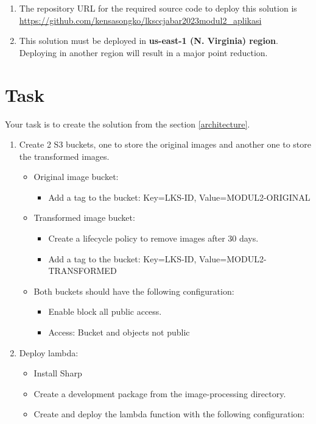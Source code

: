 \documentclass{article}
\begin{document}
\begin{enumerate}
\item The repository URL for the required source code to deploy this solution is \href{https://github.com/kensasongko/lksccjabar2023modul2_aplikasi}{https://github.com/kensasongko/lksccjabar2023modul2\_aplikasi}
\item This solution must be deployed in \textbf{us-east-1 (N. Virginia) region}. Deploying in another region will result in a major point reduction.
\end{enumerate}

\section{Task}
Your task is to create the solution from the section \ref{architecture}.
\begin{enumerate}
\item Create 2 S3 buckets, one to store the original images and another one to store the transformed images.
  \begin{itemize}
    \item Original image bucket:
    \begin{itemize}
      \item Add a tag to the bucket: Key=LKS-ID, Value=MODUL2-ORIGINAL
    \end{itemize}
    \item Transformed image bucket:
    \begin{itemize}
      \item Create a lifecycle policy to remove images after 30 days.
      \item Add a tag to the bucket: Key=LKS-ID, Value=MODUL2-TRANSFORMED
    \end{itemize}
    \item Both buckets should have the following configuration:
    \begin{itemize}
      \item Enable block all public access.
      \item Access: Bucket and objects not public
    \end{itemize}
  \end{itemize}
\item Deploy lambda:
  \begin{itemize}
    \item Install Sharp
    \item Create a development package from the image-processing directory.
    \item Create and deploy the lambda function with the following configuration:

\end{itemize}
\end{enumerate}
\end{document}
